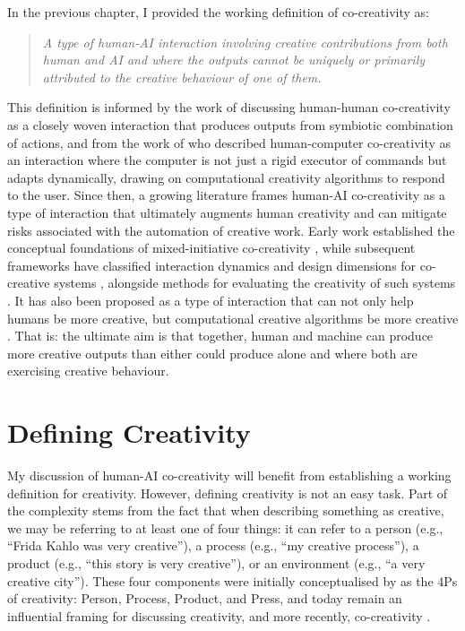 In the previous chapter, I provided the working definition of co-creativity as:

\begin{quote}
\emph{A type of human-AI interaction involving creative contributions from both human and AI and where the outputs cannot be uniquely or primarily attributed to the creative behaviour of one of them.}
\end{quote}

This definition is informed by the work of \citet{Candy2002-ra} discussing human-human co-creativity as a closely woven interaction that produces outputs from symbiotic combination of actions, and from the work of \citet{Davis2013-jy} who described human-computer co-creativity as an interaction where the computer is not just a rigid executor of commands but adapts dynamically, drawing on computational creativity algorithms to respond to the user. Since then, a growing literature frames human-AI co-creativity as a type of interaction that ultimately augments human creativity and can mitigate risks associated with the automation of creative work. Early work established the conceptual foundations of mixed-initiative co-creativity \citep{Yannakakis2014-zs, Haase2024-yp}, while subsequent frameworks have classified interaction dynamics and design dimensions for co-creative systems \citep{Kantosalo2020-zf, Rezwana2022-gg, Lin2023-zq, Moruzzi2024-cq}, alongside methods for evaluating the creativity of such systems \citep{Karimi2018-wi}. It has also been proposed as a type of interaction that can not only help humans be more creative, but computational creative algorithms be more creative \citep{Liapis2016-zt}. That is: the ultimate aim is that together, human and machine can produce more creative outputs than either could produce alone and where both are exercising creative behaviour. 

\section{Defining Creativity}

My discussion of human-AI co-creativity will benefit from establishing a working definition for creativity. However, defining creativity is not an easy task. Part of the complexity stems from the fact that when describing something as creative, we may be referring to at least one of four things: it can refer to a person (e.g., ``Frida Kahlo was very creative''), a process (e.g., ``my creative process''), a product (e.g., ``this story is very creative''), or an environment (e.g., ``a very creative city''). These four components were initially conceptualised by \citet{Rhodes1961-od} as the 4Ps of creativity: Person, Process, Product, and Press, and today remain an influential framing for discussing creativity, and more recently, co-creativity \citep{Kantosalo2019-pz}. 

